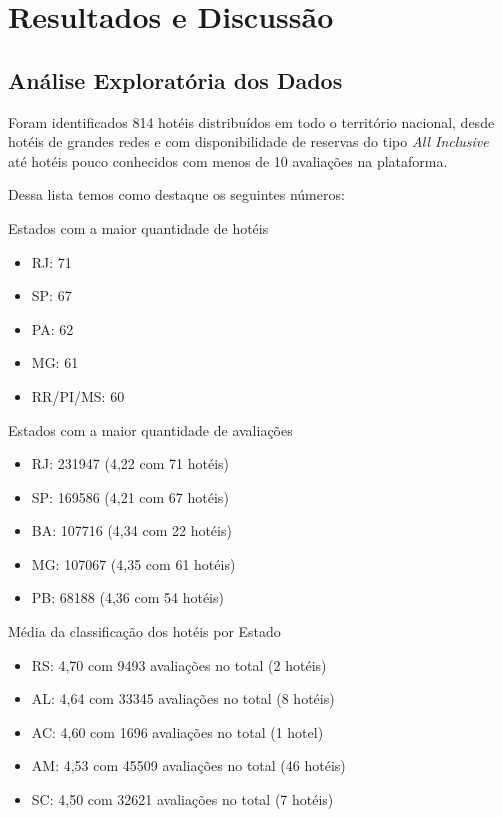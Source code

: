 \chapter{Resultados e Discussão}
\label{cap:resultados}

\section{Análise Exploratória dos Dados}
\label{cap:resultados:sec:analise_exploratoria}

Foram identificados 814 hotéis distribuídos em todo o território nacional, desde hotéis de grandes redes e com disponibilidade de reservas do tipo \textit{All Inclusive} até hotéis pouco conhecidos com menos de 10 avaliações na plataforma.

Dessa lista temos como destaque os seguintes números:

Estados com a maior quantidade de hotéis
\begin{itemize}
	\item RJ: 71
	\item SP: 67
	\item PA: 62
	\item MG: 61
	\item RR/PI/MS: 60
\end{itemize}

Estados com a maior quantidade de avaliações

\begin{itemize}
	\item RJ: 231947 (4,22 com 71 hotéis)
	\item SP: 169586 (4,21 com 67 hotéis)
	\item BA: 107716 (4,34 com 22 hotéis)
	\item MG: 107067 (4,35 com 61 hotéis)
	\item PB: 68188 (4,36 com 54 hotéis)
\end{itemize}

Média da classificação dos hotéis por Estado

\begin{itemize}
	\item RS: 4,70 com 9493 avaliações no total (2 hotéis)
	\item AL: 4,64 com 33345 avaliações no total (8 hotéis)
	\item AC: 4,60 com 1696 avaliações no total (1 hotel)
	\item AM: 4,53 com 45509 avaliações no total (46 hotéis)
	\item SC: 4,50 com 32621 avaliações no total (7 hotéis)
\end{itemize}

